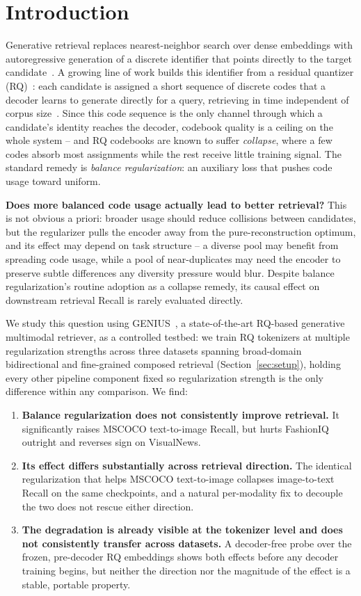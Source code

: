 \section{Introduction}
\label{sec:intro}

Generative retrieval replaces nearest-neighbor search over dense embeddings with autoregressive generation of a discrete identifier that points directly to the target candidate~\cite{tay2022dsi}. A growing line of work builds this identifier from a residual quantizer (RQ)~\cite{lee2022rqvae}: each candidate is assigned a short sequence of discrete codes that a decoder learns to generate directly for a query, retrieving in time independent of corpus size~\cite{rajput2023tiger}. Since this code sequence is the only channel through which a candidate's identity reaches the decoder, codebook quality is a ceiling on the whole system -- and RQ codebooks are known to suffer \emph{collapse}, where a few codes absorb most assignments while the rest receive little training signal. The standard remedy is \emph{balance regularization}: an auxiliary loss that pushes code usage toward uniform.

\textbf{Does more balanced code usage actually lead to better retrieval?} This is not obvious a priori: broader usage should reduce collisions between candidates, but the regularizer pulls the encoder away from the pure-reconstruction optimum, and its effect may depend on task structure -- a diverse pool may benefit from spreading code usage, while a pool of near-duplicates may need the encoder to preserve subtle differences any diversity pressure would blur. Despite balance regularization's routine adoption as a collapse remedy, its causal effect on downstream retrieval Recall is rarely evaluated directly.

We study this question using GENIUS~\cite{kim2025genius}, a state-of-the-art RQ-based generative multimodal retriever, as a controlled testbed: we train RQ tokenizers at multiple regularization strengths across three datasets spanning broad-domain bidirectional and fine-grained composed retrieval (Section~\ref{sec:setup}), holding every other pipeline component fixed so regularization strength is the only difference within any comparison. We find:

\begin{enumerate}
\item \textbf{Balance regularization does not consistently improve retrieval.} It significantly raises MSCOCO text-to-image Recall, but hurts FashionIQ outright and reverses sign on VisualNews.
\item \textbf{Its effect differs substantially across retrieval direction.} The identical regularization that helps MSCOCO text-to-image collapses image-to-text Recall on the same checkpoints, and a natural per-modality fix to decouple the two does not rescue either direction.
\item \textbf{The degradation is already visible at the tokenizer level and does not consistently transfer across datasets.} A decoder-free probe over the frozen, pre-decoder RQ embeddings shows both effects before any decoder training begins, but neither the direction nor the magnitude of the effect is a stable, portable property.
\end{enumerate}

